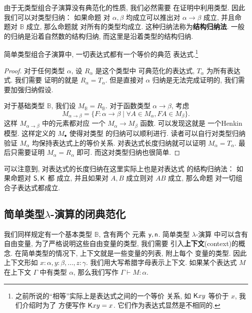 由于无类型组合子演算没有典范化的性质, 我们必然需要
在证明中利用类型. 因此我们可以对类型归纳： 如果命题
对 \(\alpha,\beta\) 均成立可以推出对 \(\alpha\to\beta\)
成立, 并且命题对 \(\mathbb B\) 成立, 那么命题就
对所有的类型均成立. 这种归纳法称为\textbf{结构归纳法}.
一般的归纳是沿着自然数的结构归纳, 而这里是沿着类型的结构归纳.

\begin{theorem}
简单类型组合子演算中, 一切表达式都有一个等价的典范
表达式.\footnote{之前所说的“相等”实际上是表达式之间的一个等价
关系, 如 \(\textsf{K}xy\) 等价于 \(x\), 我们介绍时为了
方便写作 \(\textsf{K}xy = x\). 它们作为表达式显然是不相同的.}
\end{theorem}
\begin{proof}
对于任何类型 \(\alpha\), 设 \(R_\alpha\) 是这个类型中
可典范化的表达式, \(T_\alpha\) 为所有表达式. 我们需要
证明的就是 \(R_\alpha = T_\alpha\). 但是直接对 \(\alpha\)
归纳是无法完成证明的, 我们需要加强归纳假设.

对于基础类型 \(\mathbb B\), 我们设 \(M_{\mathbb B} = R_{\mathbb B}\).
对于函数类型 \(\alpha \to \beta\), 考虑
\[M_{\alpha \to \beta} = \{F : \alpha \to \beta \mid
\forall A \in M_\alpha, FA \in M_\beta\}.\]
这样 \(M_{\alpha \to \beta}\) 中的元素都对应
一个 \(M_\alpha \to M_\beta\) 函数. 可以发现这就是
一个Henkin模型. 这样定义的 \(M_\bullet\) 使得对类型
的归纳可以顺利进行. 读者可以自行对类型归纳验证 \(M_\alpha\)
均保持表达式上的等价关系. 对表达式长度归纳就可以证明
\(M_\alpha = T_\alpha\). 最后只需要证明 \(M_\alpha = R_\alpha\)
即可. 而这对类型归纳也很简单.
\end{proof}

可以注意到, 对表达式的长度归纳在这里实际上也是对表达式
的结构归纳法： 如果命题对 \(\textsf{S}, \textsf{K}\) 都
成立, 并且如果对 \(A,B\) 成立则对 \(AB\) 成立, 那么命题
对一切组合子表达式都成立.

\subsection{简单类型\texorpdfstring{\(\lambda\)}{Lambda}-演算的闭典范化}
\label{beginning:stlc:canonicity}
我们同样规定有一个基本类型 \(\mathbb B\), 含有两个
元素 \(\textsf{y}, \textsf{n}\). 简单类型 \(\lambda\)-演算
中可以含有自由变量, 为了严格说明这些自由变量的类型, 我们需要
引入\textbf{上下文}(context)的概念.
在简单类型的情况下, 上下文就是一些变量的列表, 附上每个
变量的类型. 因此上下文形如 \(x{:}\alpha, y{:}\beta, \dots, z{:}\gamma\).
我们用大写希腊字母表示上下文. 如果某个表达式 \(M\)
在上下文 \(\Gamma\) 中有类型 \(\alpha\),
那么我们写作 \(\Gamma \vdash M : \alpha\).

